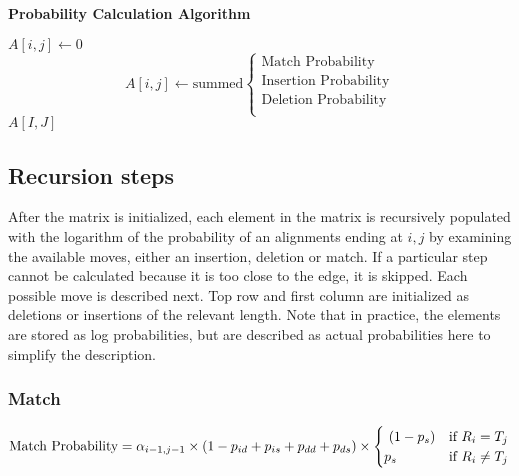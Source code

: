 \documentclass[fleqn,10pt]{SelfArx} %
\begin{document}
\begin{algorithm}
\caption*{\textbf{Probability Calculation Algorithm}}
\label{calcScore}
\begin{algorithmic}[h]
\STATE $A[i,j] \leftarrow 0$
\ELSE
\STATE \[
	A[i,j]  \leftarrow \text{summed}
\begin{cases}
	\text{Match Probability} \\
	\text{Insertion Probability} \\
	\text{Deletion Probability} \\
   	\end{cases}
\]
\ENDIF	
\ENDFOR
\ENDFOR
\RETURN $A[I,J]$
\end{algorithmic}
\end{algorithm}





\subsection{Recursion steps}
After the matrix is initialized, each element in the matrix is recursively populated with the logarithm of the probability of an alignments ending at $i,j$ by examining the available moves, either an insertion, deletion or match.  If a particular step cannot be calculated because it is too close to the edge, it is skipped.  Each possible move is described next.  Top row and first column are initialized as deletions or insertions of the relevant length.  Note that in practice, the elements are stored as log probabilities, but are described as actual probabilities here to simplify the description.






\subsubsection{\textbf{Match}}


\begin{dmath}
\text{Match Probability} = \\
	 \alpha_{i-1,j-1}  \times  (1-p_{id}+p_{is}+p_{dd}+p_{ds})  \times
	 \begin{cases}
							 \ (1-p_{s}) & \text{if }  R_{i} = T_{j} \\
							 p_{s}  & \text{if }  R_{i}  \neq T_{j} 
							 \end{cases}
\end{dmath}
\end{document}
